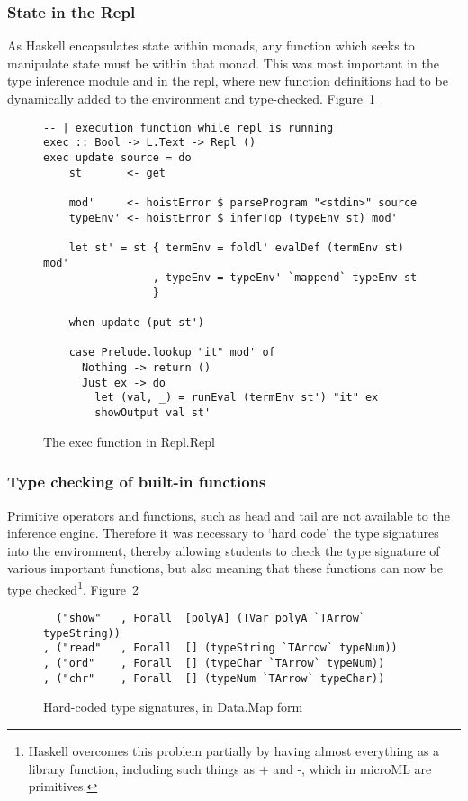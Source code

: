 \subsubsection{State in the Repl}
As Haskell encapsulates state within monads, any function which seeks to manipulate state must be
within that monad. This was most important in the type inference module and in the repl, where new
function definitions had to be dynamically added to the environment and type-checked.
Figure~\ref{fig:exec}

\begin{landscape}
\begin{figure}
    \begin{verbatim}
-- | execution function while repl is running
exec :: Bool -> L.Text -> Repl ()
exec update source = do
    st       <- get

    mod'     <- hoistError $ parseProgram "<stdin>" source
    typeEnv' <- hoistError $ inferTop (typeEnv st) mod'

    let st' = st { termEnv = foldl' evalDef (termEnv st) mod'
                 , typeEnv = typeEnv' `mappend` typeEnv st 
                 }

    when update (put st')

    case Prelude.lookup "it" mod' of
      Nothing -> return ()
      Just ex -> do
        let (val, _) = runEval (termEnv st') "it" ex
        showOutput val st'
    \end{verbatim}
    \caption{The exec function in Repl.Repl}
\label{fig:exec}
\end{figure}
\end{landscape}

\subsubsection{Type checking of built-in functions}
Primitive operators and functions, such as head and tail are not available to the inference engine.
Therefore it was necessary to `hard code' the type signatures into the environment, thereby allowing
students to check the type signature of various important functions, but also meaning that these
functions can now be type checked\footnote{Haskell overcomes this problem partially by having almost
everything as a library function, including such things as + and -, which in microML are
primitives.}. Figure~\ref{fig:typesigs}

\begin{figure}
    \begin{verbatim}
  ("show"   , Forall  [polyA] (TVar polyA `TArrow` typeString))
, ("read"   , Forall  [] (typeString `TArrow` typeNum))
, ("ord"    , Forall  [] (typeChar `TArrow` typeNum))
, ("chr"    , Forall  [] (typeNum `TArrow` typeChar))
    \end{verbatim}
    \caption{Hard-coded type signatures, in Data.Map form}
\label{fig:typesigs}
\end{figure}

